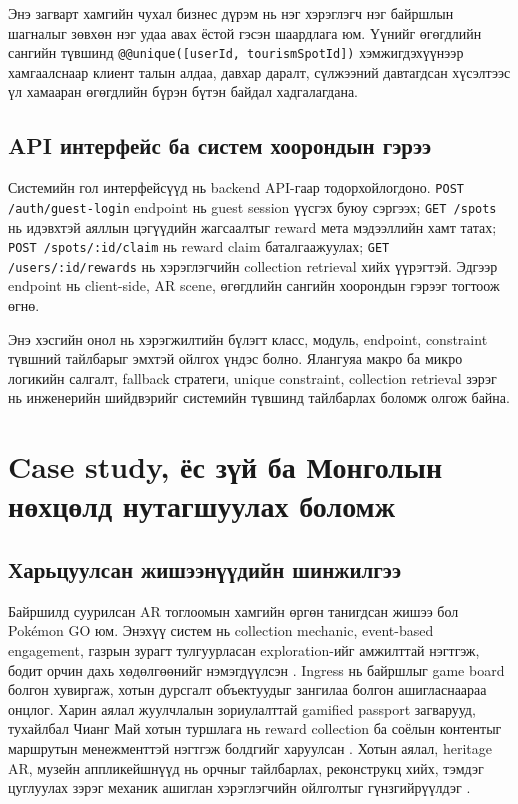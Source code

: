 \begin{sloppy}
Энэ загварт хамгийн чухал бизнес дүрэм нь нэг хэрэглэгч нэг байршлын шагналыг зөвхөн нэг удаа авах ёстой гэсэн шаардлага юм. Үүнийг өгөгдлийн сангийн түвшинд \texttt{@@unique([userId, tourismSpotId])} хэмжигдэхүүнээр хамгаалснаар клиент талын алдаа, давхар даралт, сүлжээний давтагдсан хүсэлтээс үл хамааран өгөгдлийн бүрэн бүтэн байдал хадгалагдана.

\subsection{API интерфейс ба систем хоорондын гэрээ}

Системийн гол интерфейсүүд нь backend API-гаар тодорхойлогдоно. \texttt{POST /auth/guest-login} endpoint нь guest session үүсгэх буюу сэргээх; \texttt{GET /spots} нь идэвхтэй аяллын цэгүүдийн жагсаалтыг reward мета мэдээллийн хамт татах; \texttt{POST /spots/:id/claim} нь reward claim баталгаажуулах; \texttt{GET /users/:id/rewards} нь хэрэглэгчийн collection retrieval хийх үүрэгтэй. Эдгээр endpoint нь client-side, AR scene, өгөгдлийн сангийн хоорондын гэрээг тогтоож өгнө.

Энэ хэсгийн онол нь хэрэгжилтийн бүлэгт класс, модуль, endpoint, constraint түвшний тайлбарыг эмхтэй ойлгох үндэс болно. Ялангуяа макро ба микро логикийн салгалт, fallback стратеги, unique constraint, collection retrieval зэрэг нь инженерийн шийдвэрийг системийн түвшинд тайлбарлах боломж олгож байна.

\section{Case study, ёс зүй ба Монголын нөхцөлд нутагшуулах боломж}

\subsection{Харьцуулсан жишээнүүдийн шинжилгээ}

Байршилд суурилсан AR тоглоомын хамгийн өргөн танигдсан жишээ бол Pok\'emon GO юм. Энэхүү систем нь collection mechanic, event-based engagement, газрын зурагт тулгуурласан exploration-ийг амжилттай нэгтгэж, бодит орчин дахь хөдөлгөөнийг нэмэгдүүлсэн \cite{Althoff2016PokemonGO}. Ingress нь байршлыг game board болгон хувиргаж, хотын дурсгалт объектуудыг зангилаа болгон ашигласнаараа онцлог. Харин аялал жуулчлалын зориулалттай gamified passport загварууд, тухайлбал Чианг Май хотын туршлага нь reward collection ба соёлын контентыг маршрутын менежменттэй нэгтгэж болдгийг харуулсан \cite{Thinnukool2025LannaPassport}. Хотын аялал, heritage AR, музейн аппликейшнүүд нь орчныг тайлбарлах, реконструкц хийх, тэмдэг цуглуулах зэрэг механик ашиглан хэрэглэгчийн ойлголтыг гүнзгийрүүлдэг \cite{Yovcheva2014AugmentedTourism,Kounavis2012TourismAR}.


\end{sloppy}
